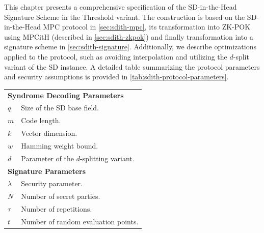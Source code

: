 \documentclass[11pt]{report}
\theoremstyle{definition}
\theoremstyle{plain}
\begin{document}
This chapter presents a comprehensive specification of the SD-in-the-Head Signature Scheme in the Threshold variant. The construction is based on the SD-in-the-Head MPC protocol in \autoref{sec:sdith-mpc}, its transformation into ZK-POK using MPCitH (described in \autoref{sec:sdith-zkpok}) and finally transformation into a signature scheme in \autoref{sec:sdith-signature}. Additionally, we describe optimizations applied to the protocol, such as avoiding interpolation and utilizing the $d$-split variant of the SD instance. A detailed table summarizing the protocol parameters and security assumptions is provided in \autoref{tab:sdith-protocol-parameters}.

\begin{table}[]
  \begin{tabular}{p{}p{}}
    \hline
    \multicolumn{2}{l}{\textbf{Syndrome Decoding Parameters}}                                                                             \\
    $q$                          & Size of the SD base field.                                                                             \\
    $m$                          & Code length.                                                                                           \\
    $k$                          & Vector dimension.                                                                                      \\
    $w$                          & Hamming weight bound.                                                                                  \\
    $d$                          & Parameter of the $d$-splitting variant.                                                                \\ \hline

    \multicolumn{2}{l}{\textbf{Signature Parameters}}                                                                                     \\
    $\lambda$                    & Security parameter.                                                                                    \\
    $N$                          & Number of secret parties.                                                                              \\
    $\tau$                       & Number of repetitions.                                                                                 \\
    $t$                          & Number of random evaluation points.                                                                    \\ \hline


\end{tabular}
\end{table}
\end{document}
